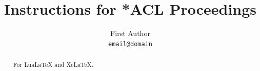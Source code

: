 \documentclass[11pt]{article}
\title{Instructions for *ACL Proceedings}
\author{First Author \\
  \texttt{email@domain}}
\begin{document}
\maketitle
\begin{abstract}
For LuaLaTeX and XeLaTeX.
\end{abstract}


\end{document}
